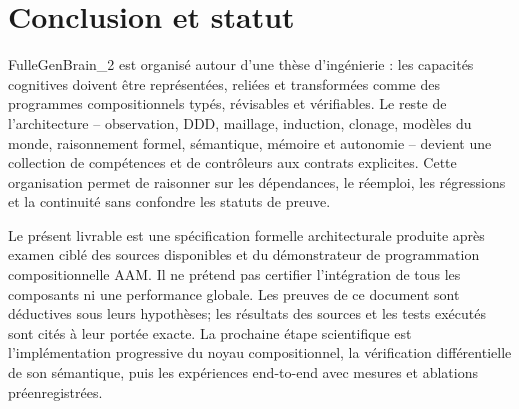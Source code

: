 \documentclass[11pt,a4paper]{article}
\begin{document}
\section{Conclusion et statut}
FulleGenBrain\_2 est organisé autour d'une thèse d'ingénierie : les capacités cognitives doivent être représentées, reliées et transformées comme des programmes compositionnels typés, révisables et vérifiables. Le reste de l'architecture -- observation, DDD, maillage, induction, clonage, modèles du monde, raisonnement formel, sémantique, mémoire et autonomie -- devient une collection de compétences et de contrôleurs aux contrats explicites. Cette organisation permet de raisonner sur les dépendances, le réemploi, les régressions et la continuité sans confondre les statuts de preuve.

Le présent livrable est une spécification formelle architecturale produite après examen ciblé des sources disponibles et du démonstrateur de programmation compositionnelle AAM. Il ne prétend pas certifier l'intégration de tous les composants ni une performance globale. Les preuves de ce document sont déductives sous leurs hypothèses; les résultats des sources et les tests exécutés sont cités à leur portée exacte. La prochaine étape scientifique est l'implémentation progressive du noyau compositionnel, la vérification différentielle de son sémantique, puis les expériences end-to-end avec mesures et ablations préenregistrées.
\end{document}
